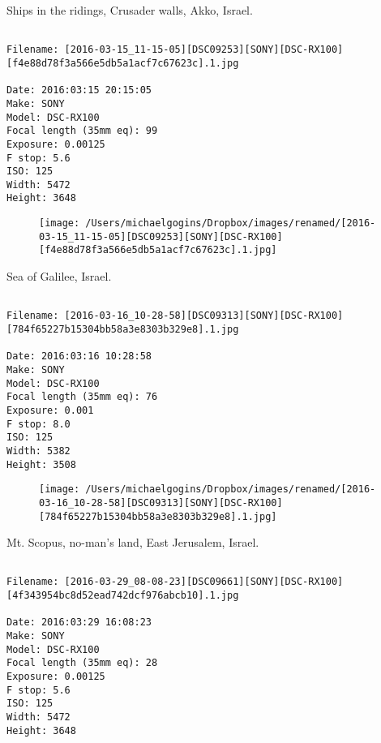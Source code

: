 \clearpage
\onecolumn
\noindent Ships in the ridings, Crusader walls, Akko, Israel.
\noindent
\begin{lstlisting}

Filename: [2016-03-15_11-15-05][DSC09253][SONY][DSC-RX100][f4e88d78f3a566e5db5a1acf7c67623c].1.jpg

Date: 2016:03:15 20:15:05
Make: SONY
Model: DSC-RX100
Focal length (35mm eq): 99
Exposure: 0.00125
F stop: 5.6
ISO: 125
Width: 5472
Height: 3648
\end{lstlisting}
\clearpage

\begin{figure}
\texttt{[image: /Users/michaelgogins/Dropbox/images/renamed/[2016-03-15\_11-15-05][DSC09253][SONY][DSC-RX100][f4e88d78f3a566e5db5a1acf7c67623c].1.jpg]}
\end{figure}
    
\clearpage
\onecolumn
\noindent Sea of Galilee, Israel.
\noindent
\begin{lstlisting}

Filename: [2016-03-16_10-28-58][DSC09313][SONY][DSC-RX100][784f65227b15304bb58a3e8303b329e8].1.jpg

Date: 2016:03:16 10:28:58
Make: SONY
Model: DSC-RX100
Focal length (35mm eq): 76
Exposure: 0.001
F stop: 8.0
ISO: 125
Width: 5382
Height: 3508
\end{lstlisting}
\clearpage

\begin{figure}
\texttt{[image: /Users/michaelgogins/Dropbox/images/renamed/[2016-03-16\_10-28-58][DSC09313][SONY][DSC-RX100][784f65227b15304bb58a3e8303b329e8].1.jpg]}
\end{figure}
    
\clearpage
\onecolumn
\noindent Mt. Scopus, no-man's land, East Jerusalem, Israel.
\noindent
\begin{lstlisting}

Filename: [2016-03-29_08-08-23][DSC09661][SONY][DSC-RX100][4f343954bc8d52ead742dcf976abcb10].1.jpg

Date: 2016:03:29 16:08:23
Make: SONY
Model: DSC-RX100
Focal length (35mm eq): 28
Exposure: 0.00125
F stop: 5.6
ISO: 125
Width: 5472
Height: 3648
\end{lstlisting}
\clearpage

